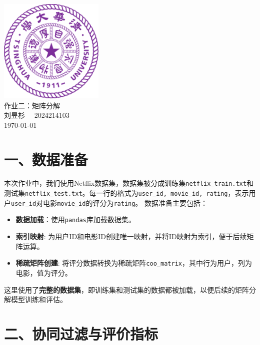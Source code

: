 \documentclass[12pt]{ctexart}
\begin{document}
\begin{titlepage}
    \begin{center}
        \includegraphics[width=5cm]{tsinghua_logo.png}\\[4cm]  %
        {\Huge 作业二：矩阵分解} \\[4cm]
        {\large 刘昱杉  \ \  2024214103}\\[6cm]
        {\normalsize \today}\\[1cm]

    \end{center}
\end{titlepage}

\section*{一、数据准备}

本次作业中，我们使用Netflix数据集，数据集被分成训练集\texttt{netflix\_train.txt}和测试集\texttt{netflix\_test.txt}。每一行的格式为\texttt{user\_id, movie\_id, rating}，表示用户\texttt{user\_id}对电影\texttt{movie\_id}的评分为\texttt{rating}。
数据准备主要包括：
\begin{itemize}
    \item \textbf{数据加载}：使用\texttt{pandas}库加载数据集。
    \item \textbf{索引映射}: 为用户ID和电影ID创建唯一映射，并将ID映射为索引，便于后续矩阵运算。
    \item \textbf{稀疏矩阵创建}: 将评分数据转换为稀疏矩阵\texttt{coo\_matrix}，其中行为用户，列为电影，值为评分。
\end{itemize}

这里使用了\textbf{完整的数据集}，即训练集和测试集的数据都被加载，以便后续的矩阵分解模型训练和评估。

\section*{二、协同过滤与评价指标}
\end{document}
